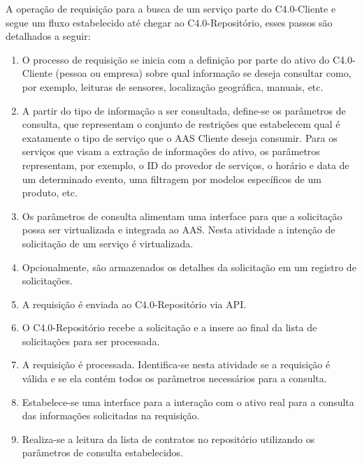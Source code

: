 A operação de requisição para a busca de um serviço parte do C4.0-Cliente e segue um fluxo estabelecido até chegar ao C4.0-Repositório, esses passos são detalhados a seguir:

\begin{enumerate}

	\item O processo de requisição se inicia com a definição por parte do ativo do C4.0-Cliente (pessoa ou empresa) sobre qual informação se deseja consultar como, por exemplo, leituras de sensores, localização geográfica, manuais, etc.

	\item A partir do tipo de informação a ser consultada, define-se os parâmetros de consulta, que representam o conjunto de restrições que estabelecem qual é exatamente o tipo de serviço que o AAS Cliente deseja consumir. Para os serviços que visam a extração de informações do ativo, os parâmetros representam, por exemplo, o ID do provedor de serviços, o horário e data de um determinado evento, uma filtragem por modelos específicos de um produto, etc.

	\item Os parâmetros de consulta alimentam uma interface para que a solicitação possa ser virtualizada e integrada ao AAS. Nesta atividade a intenção de solicitação de um serviço é virtualizada.

	\item Opcionalmente, são armazenados os detalhes da solicitação em um registro de solicitações.

	\item A requisição é enviada ao C4.0-Repositório via API.

	\item O C4.0-Repositório recebe a solicitação e a insere ao final da lista de solicitações para ser processada.

	\item A requisição é processada. Identifica-se nesta atividade se a requisição é válida e se ela contém todos os parâmetros necessários para a consulta.

	\item Estabelece-se uma interface para a interação com o ativo real para a consulta das informações solicitadas na requisição.

	\item Realiza-se a leitura da lista de contratos no repositório utilizando os parâmetros de consulta estabelecidos.

\end{enumerate}

